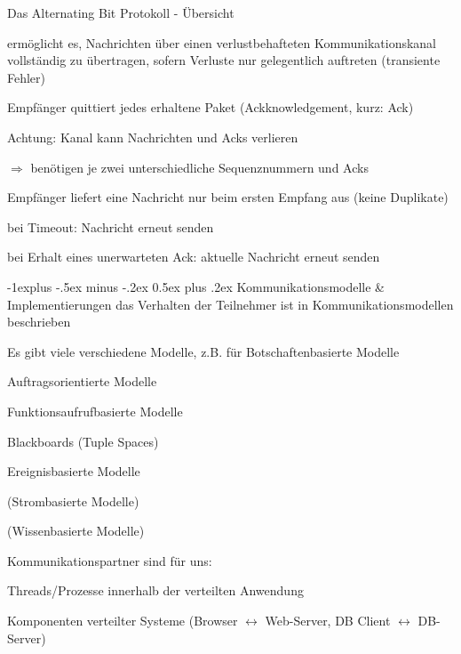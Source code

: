 \documentclass[10pt]{article}
\makeatletter
\renewcommand{\subsection}{\@startsection{subsection}{2}{0mm}%
                                {-1explus -.5ex minus -.2ex}%
                                {0.5ex plus .2ex}%
                                {\normalfont\normalsize\bfseries}}
\makeatother
\begin{document}
Das Alternating Bit Protokoll - Übersicht
\begin{itemize*}
  \item ermöglicht es, Nachrichten über einen verlustbehafteten Kommunikationskanal vollständig zu übertragen, sofern Verluste nur gelegentlich auftreten (transiente Fehler)
  \item Empfänger quittiert jedes erhaltene Paket (Ackknowledgement, kurz: Ack)
  \item Achtung: Kanal kann Nachrichten und Acks verlieren
  \begin{itemize*}
    \item $\Rightarrow$ benötigen je zwei unterschiedliche Sequenznummern und Acks
  \end{itemize*}
  \item Empfänger liefert eine Nachricht nur beim ersten Empfang aus (keine Duplikate)
  \item bei Timeout: Nachricht erneut senden
  \item bei Erhalt eines unerwarteten Ack: aktuelle Nachricht erneut senden
\end{itemize*}

\subsection{Kommunikationsmodelle \& Implementierungen}
das Verhalten der Teilnehmer ist in Kommunikationsmodellen beschrieben

Es gibt viele verschiedene Modelle, z.B. für Botschaftenbasierte Modelle
\begin{itemize*}
  \item Auftragsorientierte Modelle
  \item Funktionsaufrufbasierte Modelle
  \item Blackboards (Tuple Spaces)
  \item Ereignisbasierte Modelle
  \item (Strombasierte Modelle)
  \item (Wissenbasierte Modelle)
\end{itemize*}

Kommunikationspartner sind für uns:
\begin{itemize*}
  \item Threads/Prozesse innerhalb der verteilten Anwendung
  \item Komponenten verteilter Systeme (Browser $\leftrightarrow$ Web-Server, DB Client $\leftrightarrow$ DB-Server)
\end{itemize*}
\end{document}
